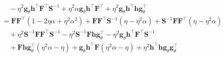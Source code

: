\documentclass[msc,deptreport.inf]{infthesis} %
\newcommand{\matr}[1]{\mathbf{#1}}
\begin{document}
\begin{align}
\begin{split}
	& \quad - \eta^2 \matr{g}_\theta \matr{h}^\intercal \matr{F}^\intercal \matr{S}^{-1} + \eta^2 \alpha \matr{g}_\theta \matr{h}^\intercal \matr{F}^\intercal + \eta^2 \matr{g}_\theta \matr{h}^\intercal \matr{h} \matr{g}_\theta^\intercal \\
	& = \matr{F}\matr{F}^\intercal (1 - 2\eta \alpha + \eta^2 \alpha^2)
	+ \matr{F} \matr{F}^\intercal \matr{S}^{-1}(\eta - \eta^2 \alpha) 
	+ \matr{S}^{-1} \matr{F} \matr{F}^\intercal (\eta - \eta^2 \alpha) \\
	& \quad + \eta^2 \matr{S}^{-1} \matr{F} \matr{F}^\intercal \matr{S}^{-1}
	- \eta^2 \matr{S}^{-1} \matr{F} \matr{h} \matr{g}_\theta^\intercal
	- \eta^2 \matr{g}_\theta \matr{h}^\intercal \matr{F}^\intercal \matr{S}^{-1} \\
	& \quad + \matr{F} \matr{h} \matr{g}_\theta^\intercal(\eta^2 \alpha - \eta) 
	+ \matr{g}_\theta \matr{h}^\intercal \matr{F}(\eta^2 \alpha - \eta)
	+ \eta^2 \matr{h}^\intercal \matr{h} \matr{g}_\theta \matr{g}_\theta^\intercal
\end{split}
\end{align}
\end{document}
